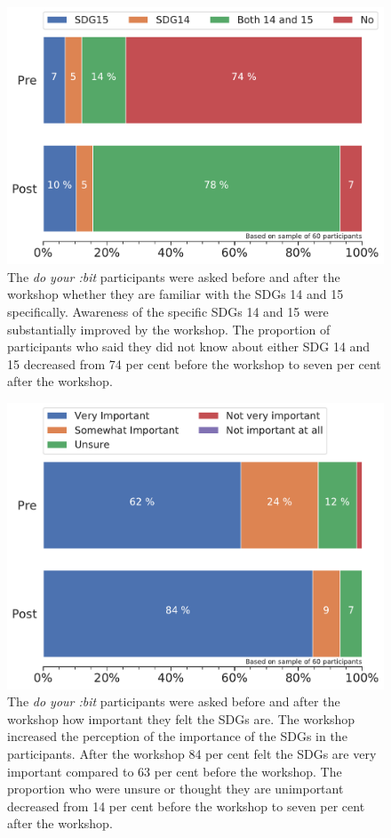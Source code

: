 \documentclass[12pt]{report} %
\newcommand{\DYB}{\textit{do your :bit }}
\begin{document}
\begin{figure}[t!]
    \centering
        \includegraphics[width=1\textwidth]{bar_knowsdg1415}
\caption{The \DYB participants were asked before and after the workshop whether they are familiar with the SDGs 14 and 15 specifically. Awareness of the specific SDGs 14 and 15 were substantially improved by the workshop. The proportion of participants who said they did not know about either SDG 14 and 15 decreased from 74 per cent before the workshop to seven per cent after the workshop.} 
\label{fig:knowsdg1415}
\end{figure}

\begin{figure}[t!]
    \centering
        \includegraphics[width=1\textwidth]{bar_sdgimportant}
\caption{The \DYB participants were asked before and after the workshop how important they felt the SDGs are. The workshop increased the perception of the importance of the SDGs in the participants. After the workshop 84 per cent felt the SDGs are very important compared to 63 per cent before the workshop. The proportion who were unsure or thought they are unimportant decreased from 14 per cent before the workshop to seven per cent after the workshop.} 
\label{fig:sdgimportant}
\end{figure}
\end{document}
